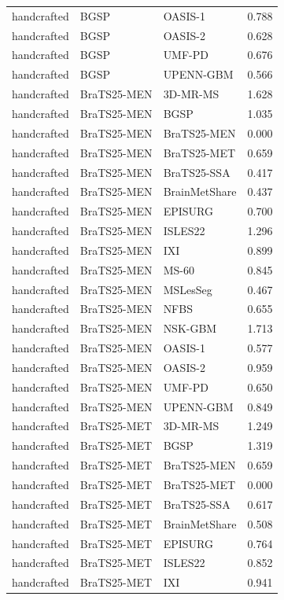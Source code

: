 \begin{tabular}{lllr}
handcrafted & BGSP & OASIS-1 & 0.788 \\
handcrafted & BGSP & OASIS-2 & 0.628 \\
handcrafted & BGSP & UMF-PD & 0.676 \\
handcrafted & BGSP & UPENN-GBM & 0.566 \\
handcrafted & BraTS25-MEN & 3D-MR-MS & 1.628 \\
handcrafted & BraTS25-MEN & BGSP & 1.035 \\
handcrafted & BraTS25-MEN & BraTS25-MEN & 0.000 \\
handcrafted & BraTS25-MEN & BraTS25-MET & 0.659 \\
handcrafted & BraTS25-MEN & BraTS25-SSA & 0.417 \\
handcrafted & BraTS25-MEN & BrainMetShare & 0.437 \\
handcrafted & BraTS25-MEN & EPISURG & 0.700 \\
handcrafted & BraTS25-MEN & ISLES22 & 1.296 \\
handcrafted & BraTS25-MEN & IXI & 0.899 \\
handcrafted & BraTS25-MEN & MS-60 & 0.845 \\
handcrafted & BraTS25-MEN & MSLesSeg & 0.467 \\
handcrafted & BraTS25-MEN & NFBS & 0.655 \\
handcrafted & BraTS25-MEN & NSK-GBM & 1.713 \\
handcrafted & BraTS25-MEN & OASIS-1 & 0.577 \\
handcrafted & BraTS25-MEN & OASIS-2 & 0.959 \\
handcrafted & BraTS25-MEN & UMF-PD & 0.650 \\
handcrafted & BraTS25-MEN & UPENN-GBM & 0.849 \\
handcrafted & BraTS25-MET & 3D-MR-MS & 1.249 \\
handcrafted & BraTS25-MET & BGSP & 1.319 \\
handcrafted & BraTS25-MET & BraTS25-MEN & 0.659 \\
handcrafted & BraTS25-MET & BraTS25-MET & 0.000 \\
handcrafted & BraTS25-MET & BraTS25-SSA & 0.617 \\
handcrafted & BraTS25-MET & BrainMetShare & 0.508 \\
handcrafted & BraTS25-MET & EPISURG & 0.764 \\
handcrafted & BraTS25-MET & ISLES22 & 0.852 \\
handcrafted & BraTS25-MET & IXI & 0.941 \\

\end{tabular}
